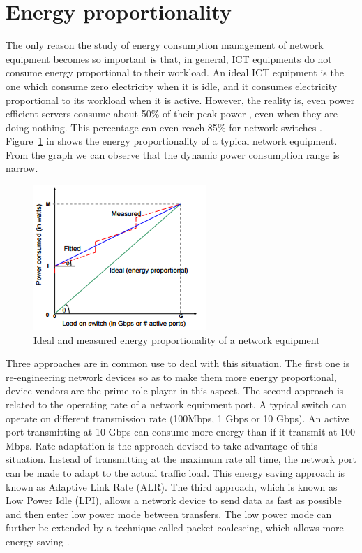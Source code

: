 \section{Energy proportionality}
\label{section:energyproportionality}
The only reason the study of energy consumption management of network equipment becomes so important is that, in general, ICT equipments do not consume energy proportional to their workload. An ideal ICT equipment is the one which consume zero electricity when it is idle, and it consumes electricity proportional to its workload when it is active. However, the reality is, even power efficient servers consume about 50\% of their peak power \cite{DBLP:journals/computer/BarrosoH07}, even when they are doing nothing. This percentage can even reach 85\% for network switches \cite{DBLP:conf/IEEEcloud/FiandrinoKBZ15}. Figure~\ref{fig:energyproportionality} in \cite{DBLP:conf/networking/MahadevanSBR09} shows the energy proportionality of a typical network equipment. From the graph we can observe that the dynamic power consumption range is narrow.
\begin{figure}[ht]
	\begin{center}
		\includegraphics{images/energyproportionality.png}
		\caption{Ideal and measured energy proportionality of a network equipment}
		\label{fig:energyproportionality}
	\end{center}
\end{figure}
Three approaches are in common use to deal with this situation. The first one is re-engineering network devices so as to make them more energy proportional, device vendors are the prime role player in this aspect. The second approach is related to the operating rate of a network equipment port. A typical switch can operate on different transmission rate (100Mbps, 1 Gbps or 10 Gbps). An active port transmitting at 10 Gbps can consume more energy than if it transmit at 100 Mbps. Rate adaptation is the approach devised to take advantage of this situation. Instead of transmitting at the maximum rate all time,  the network port can be made to adapt to the actual traffic load. This energy saving approach is known as Adaptive Link Rate (ALR). The third approach, which is known as Low Power Idle (LPI), allows a network device to send data as fast as possible and then enter low power mode between transfers. The low power mode can further be extended by a technique called packet coalescing, which allows more energy saving \cite{DBLP:journals/comsur/BollaBDC11}. 
